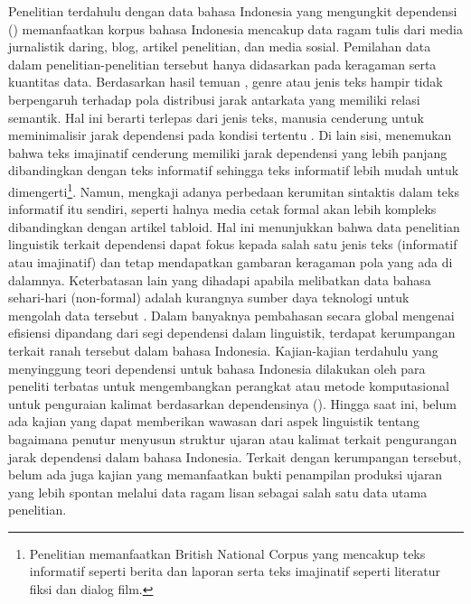 Penelitian terdahulu dengan data bahasa Indonesia yang mengungkit dependensi (\citealp{kamayani2011dependency, green2012indonesian, irmawati2015dependency, futrell2015large}) memanfaatkan korpus bahasa Indonesia mencakup data ragam tulis dari media jurnalistik daring, blog, artikel penelitian, dan media sosial. Pemilahan data dalam penelitian-penelitian tersebut hanya didasarkan pada keragaman serta kuantitas data. Berdasarkan hasil temuan \cite{wang2017effects}, genre atau jenis teks hampir tidak berpengaruh terhadap pola distribusi jarak antarkata yang memiliki relasi semantik. Hal ini berarti terlepas dari jenis teks, manusia cenderung untuk meminimalisir jarak dependensi pada kondisi tertentu \citep{wang2017effects}. Di lain sisi, \citep{wang2017effects} menemukan bahwa teks imajinatif cenderung memiliki jarak dependensi yang lebih panjang dibandingkan dengan teks informatif sehingga teks informatif lebih mudah untuk dimengerti\footnote{Penelitian \cite{wang2017effects} memanfaatkan British National Corpus yang mencakup teks informatif seperti berita dan laporan serta teks imajinatif seperti literatur fiksi dan dialog film.}. Namun, \cite{miller2011critical} mengkaji adanya perbedaan kerumitan sintaktis dalam teks informatif itu sendiri, seperti halnya media cetak formal akan lebih kompleks dibandingkan dengan artikel tabloid. Hal ini menunjukkan bahwa data penelitian linguistik terkait dependensi dapat fokus kepada salah satu jenis teks (informatif atau imajinatif) dan tetap mendapatkan gambaran keragaman pola yang ada di dalamnya. Keterbatasan lain yang dihadapi apabila melibatkan data bahasa sehari-hari (non-formal) adalah kurangnya sumber daya teknologi untuk mengolah data tersebut \citep{green2012indonesian}. Dalam banyaknya pembahasan secara global mengenai efisiensi dipandang dari segi dependensi dalam linguistik, terdapat kerumpangan terkait ranah tersebut dalam bahasa Indonesia. Kajian-kajian terdahulu yang menyinggung teori dependensi untuk bahasa Indonesia dilakukan oleh para peneliti terbatas untuk mengembangkan perangkat atau metode komputasional untuk penguraian kalimat berdasarkan dependensinya (\citealp{kamayani2011dependency, green2012indonesian, irmawati2015dependency}). Hingga saat ini, belum ada kajian yang dapat memberikan wawasan dari aspek linguistik tentang bagaimana penutur menyusun struktur ujaran atau kalimat terkait pengurangan jarak dependensi dalam bahasa Indonesia. Terkait dengan kerumpangan tersebut, belum ada juga kajian yang memanfaatkan bukti penampilan produksi ujaran yang lebih spontan melalui data ragam lisan sebagai salah satu data utama penelitian. 

